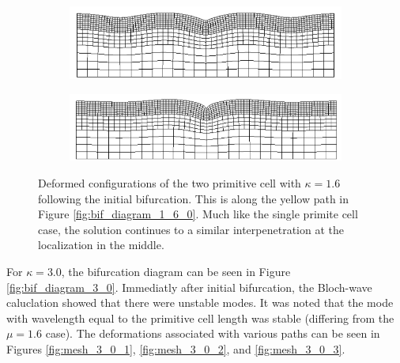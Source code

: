 \documentclass[11pt]{report}
\begin{document}
\begin{figure}[!htb]
	\begin{subfigure}[b]{0.5\textwidth}
		\includegraphics[width=\textwidth]{mesh/mesh_1_6_3_low}
	\end{subfigure}
    \begin{subfigure}[b]{0.5\textwidth}
		\includegraphics[width=\textwidth]{mesh/mesh_1_6_3_high}
	\end{subfigure}
	\captionsetup{format=hang}
	\caption{Deformed configurations of the two primitive cell with $\kappa = 1.6$ following the initial bifurcation. This is along the yellow path in Figure \ref{fig:bif_diagram_1_6_0}. Much like the single primite cell case, the solution continues to a similar interpenetration at the localization in the middle.}
    \label{fig:mesh_1_6_3}
\end{figure}

\newpage
For $\kappa = 3.0$, the bifurcation diagram can be seen in Figure \ref{fig:bif_diagram_3_0}. Immediatly after initial bifurcation, the Bloch-wave caluclation showed that there were unstable modes. It was noted that the mode with wavelength equal to the primitive cell length was stable (differing from the $\mu = 1.6$ case).
The deformations associated with various paths can be seen in Figures \ref{fig:mesh_3_0_1}, \ref{fig:mesh_3_0_2}, and \ref{fig:mesh_3_0_3}.
\end{document}
